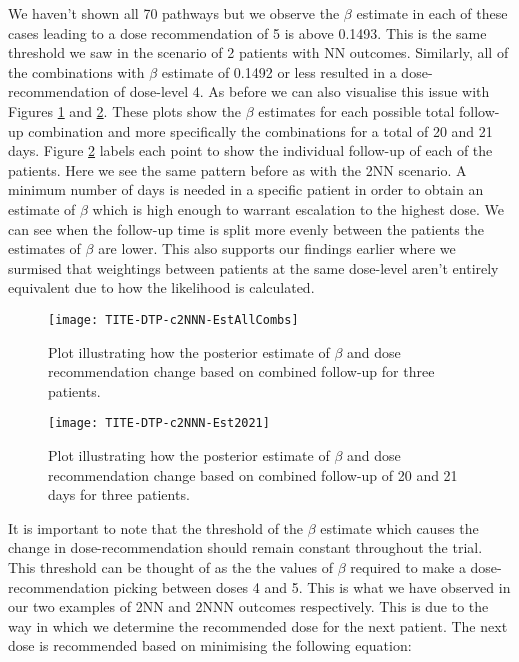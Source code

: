 We haven't shown all 70 pathways but we observe the $\beta$ estimate in each of these cases leading to a dose recommendation of 5 is above 0.1493. This is the same threshold we saw in the scenario of 2 patients with NN outcomes. Similarly, all of the combinations with $\beta$ estimate of 0.1492 or less resulted in a dose-recommendation of  dose-level 4. As before we can also visualise this issue with Figures \ref{fig_tite-dtp:c2NNNEstAllCombs} and \ref{fig_tite-dtp:c2NNNEst2021}. These plots show the $\beta$ estimates for each possible total follow-up combination and more specifically the combinations for a total of 20 and 21 days. Figure \ref{fig_tite-dtp:c2NNNEst2021} labels each point to show the individual follow-up of each of the patients. Here we see the same pattern before as with the 2NN scenario. A minimum number of days is needed in a specific patient in order to obtain an estimate of $\beta$ which is high enough to warrant escalation to the highest dose. We can see when the follow-up time is split more evenly between the patients the estimates of $\beta$ are lower. This also supports our findings earlier where we surmised that weightings between patients at the same dose-level aren't entirely equivalent due to how the likelihood is calculated. 

\begin{figure}[h!]
	\centering
	\caption[Changes in $\beta$ based on combined follow-up for three patients.]{Plot illustrating how the posterior estimate of $\beta$ and dose recommendation change based on combined follow-up for three patients.}
	\label{fig_tite-dtp:c2NNNEstAllCombs}
	\texttt{[image: TITE-DTP-c2NNN-EstAllCombs]}
\end{figure}

\begin{figure}[h!]
	\centering
	\caption[Changes in $\beta$ based on combined follow-up of 20 and 21 days for three patients.]{Plot illustrating how the posterior estimate of $\beta$ and dose recommendation change based on combined follow-up of 20 and 21 days for three patients.}
	\label{fig_tite-dtp:c2NNNEst2021}
	\texttt{[image: TITE-DTP-c2NNN-Est2021]}
\end{figure}

It is important to note that the threshold of the $\beta$ estimate which causes the change in dose-recommendation should remain constant throughout the trial. This threshold can be thought of as the the values of $\beta$ required to make a dose-recommendation picking between doses 4 and 5. This is what we have observed in our two examples of 2NN and 2NNN outcomes respectively. This is due to the way in which we determine the recommended dose for the next patient. The next dose is recommended based on minimising the following equation: 

